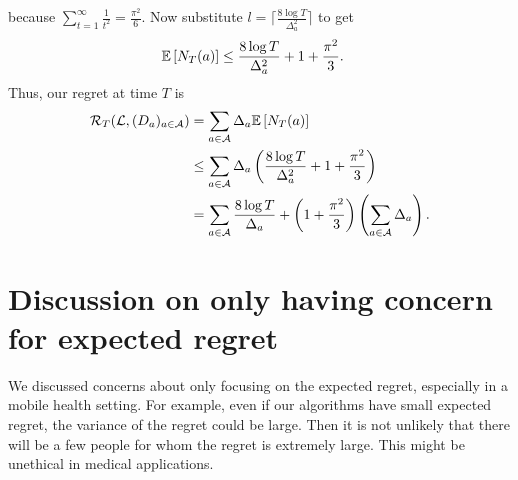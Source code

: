 \documentclass[11pt]{article}
\begin{document}
because $\sum\limits^\infty_{t = 1} \frac{1}{t^2} =
\frac{\pi^2}{6}$. Now substitute $l=\Big \lceil \frac{8\log
  T}{\Delta_a^2} \Big \rceil$ to get
\begin{align*}
\mathbb{E}\left[ N_T(a) \right] &\leq \frac{8 \log T}{\Delta_a^2} + 1 + \frac{\pi^2}{3}.
\end{align*}
Thus, our regret at time $T$ is
\begin{align*}
\mathcal{R}_T(\mathcal{L}, (D_a)_{a \in \mathcal{A}}) &=  \sum\limits_{a \in
                                         \mathcal{A}} \Delta_a \mathbb{E}\left[ N_T(a) \right]
  \\
  &\leq 
\sum\limits_{a \in \mathcal{A}} \Delta_a\left(\frac{8 \log T}{\Delta_a^2} +
    1 + \frac{\pi^2}{3}\right) \\
                                       &= \sum\limits_{a \in \mathcal{A}}
                                         \frac{8 \log T}{\Delta_a} + \left(1 +
                                         \frac{\pi^2}{3}\right)\left(\sum\limits_{a \in \mathcal{A}} \Delta_a\right).
\end{align*}

\section{Discussion on only having concern for expected regret}

We discussed concerns about only focusing on the expected regret,
especially in a mobile health setting. For example, even if our
algorithms have small expected regret, the variance of the regret
could be large. Then it is not unlikely that there will be a few
people for whom the regret is extremely large. This might be unethical
in medical applications.


\end{document}
